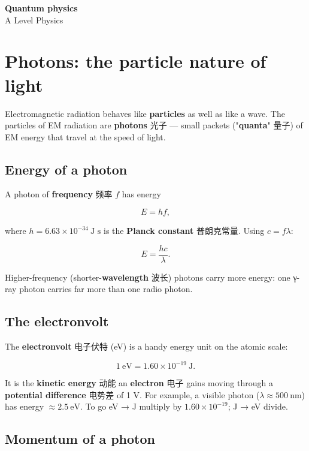 \documentclass[11pt]{article}
\begin{document}
\begin{center}
  {\LARGE\bfseries Quantum physics}\\[0.35em]
  {\large A Level Physics}
\end{center}
\vspace{0.6em}

\section*{Photons: the particle nature of light}

Electromagnetic radiation behaves like \textbf{particles} as well as like a wave. The particles of EM radiation are \textbf{photons} 光子 — small packets ("\textbf{quanta}" 量子) of EM energy that travel at the speed of light.

\subsection*{Energy of a photon}

A photon of \textbf{frequency} 频率 $f$ has energy

\[
E = h f,
\]

where $h = 6.63 \times 10^{-34}\ \text{J s}$ is the \textbf{Planck constant} 普朗克常量. Using $c = f\lambda$:

\[
E = \frac{h c}{\lambda}.
\]

Higher-frequency (shorter-\textbf{wavelength} 波长) photons carry more energy: one γ-ray photon carries far more than one radio photon.

\subsection*{The electronvolt}

The \textbf{electronvolt} 电子伏特 (eV) is a handy energy unit on the atomic scale:

\[
1\ \text{eV} = 1.60 \times 10^{-19}\ \text{J}.
\]

It is the \textbf{kinetic energy} 动能 an \textbf{electron} 电子 gains moving through a \textbf{potential difference} 电势差 of 1 V. For example, a visible photon ($\lambda \approx 500\ \text{nm}$) has energy $\approx 2.5\ \text{eV}$. To go eV → J multiply by $1.60 \times 10^{-19}$; J → eV divide.

\subsection*{Momentum of a photon}
\end{document}
